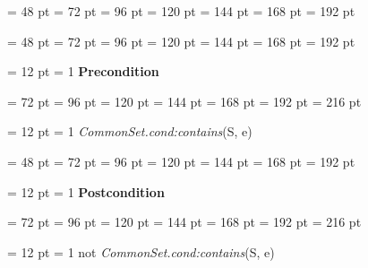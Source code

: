 {{{{\par \noindent  \leftskip = 48 pt  \leftmargini = 72 pt  \leftmarginii = 96 pt  \leftmarginiii = 120 pt  \leftmarginiv = 144 pt  \leftmarginv = 168 pt  \leftmarginvi = 192 pt {\par \noindent
\par}
\par}
{\par \noindent  \leftskip = 48 pt  \leftmargini = 72 pt  \leftmarginii = 96 pt  \leftmarginiii = 120 pt  \leftmarginiv = 144 pt  \leftmarginv = 168 pt  \leftmarginvi = 192 pt {\par \noindent
{\par \pagebreak[3.100000] \noindent \hangindent = 12 pt \hangafter = 1 
{\bf Precondition\/}\par}
{\par \noindent  \leftskip = 72 pt  \leftmargini = 96 pt  \leftmarginii = 120 pt  \leftmarginiii = 144 pt  \leftmarginiv = 168 pt  \leftmarginv = 192 pt  \leftmarginvi = 216 pt {\par \noindent
{\par \pagebreak[3.000000] \noindent \hangindent = 12 pt \hangafter = 1 
 {\em CommonSet.cond:contains\/}(S, e)\par}
\par}
\par}
\par}
\par}
{\par \noindent  \leftskip = 48 pt  \leftmargini = 72 pt  \leftmarginii = 96 pt  \leftmarginiii = 120 pt  \leftmarginiv = 144 pt  \leftmarginv = 168 pt  \leftmarginvi = 192 pt {\par \noindent
{\par \pagebreak[3.100000] \noindent \hangindent = 12 pt \hangafter = 1 
{\bf Postcondition\/}\par}
{\par \noindent  \leftskip = 72 pt  \leftmargini = 96 pt  \leftmarginii = 120 pt  \leftmarginiii = 144 pt  \leftmarginiv = 168 pt  \leftmarginv = 192 pt  \leftmarginvi = 216 pt {\par \noindent
{\par \pagebreak[3.000000] \noindent \hangindent = 12 pt \hangafter = 1 
not  {\em CommonSet.cond:contains\/}(S, e)\par}
\par}
\par}
\par}
\par}
\par}
}}

